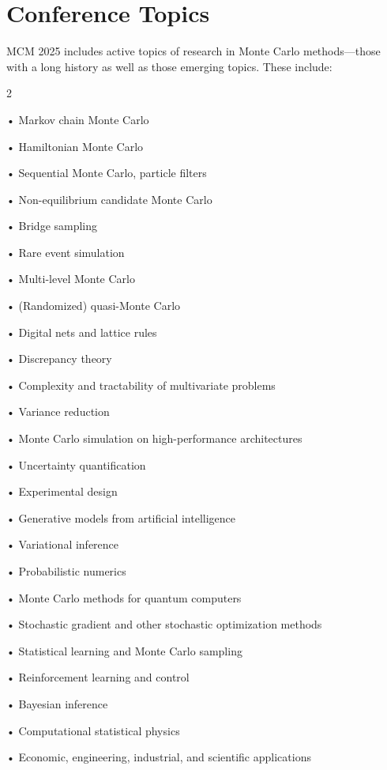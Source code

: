 

\section{Conference Topics}

MCM 2025  includes active topics of research in Monte Carlo methods—those
with a long history as well as those emerging topics. These include:

\setlength{\columnsep}{1cm}
\begin{multicols}{2}
	\raggedright
	• Markov chain Monte Carlo

	• Hamiltonian Monte Carlo

	• Sequential Monte Carlo, particle filters

	• Non-equilibrium candidate Monte Carlo

	• Bridge sampling

	• Rare event simulation

	• Multi-level Monte Carlo

	• (Randomized) quasi-Monte Carlo

	• Digital nets and lattice rules

	• Discrepancy theory

	• Complexity and tractability of multivariate problems

	• Variance reduction

	• Monte Carlo simulation on high-performance architectures

	• Uncertainty quantification

	• Experimental design

	• Generative models from artificial intelligence

	• Variational inference

	• Probabilistic numerics

	• Monte Carlo methods for quantum computers

	• Stochastic gradient and other stochastic optimization methods

	• Statistical learning and Monte Carlo sampling

	• Reinforcement learning and control

	• Bayesian inference

	• Computational statistical physics

	• Economic, engineering, industrial, and scientific applications

\end{multicols}






